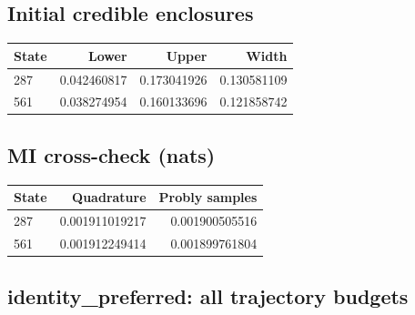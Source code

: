 \reservetable
\subsection{Initial credible enclosures}

\begingroup\small
\setlength{\tabcolsep}{4pt}
\begin{longtable}{lrrr}
\toprule

State & Lower & Upper & Width\\\midrule\endhead

287 & 0.042460817 & 0.173041926 & 0.130581109\\

561 & 0.038274954 & 0.160133696 & 0.121858742\\

\bottomrule
\end{longtable}
\endgroup

\reservetable
\subsection{MI cross-check (nats)}

\begingroup\small
\setlength{\tabcolsep}{4pt}
\begin{longtable}{lrr}
\toprule

State & Quadrature & Probly samples\\\midrule\endhead

287 & 0.001911019217 & 0.001900505516\\

561 & 0.001912249414 & 0.001899761804\\

\bottomrule
\end{longtable}
\endgroup

\reservetable
\subsection{identity\_preferred: all trajectory budgets}

